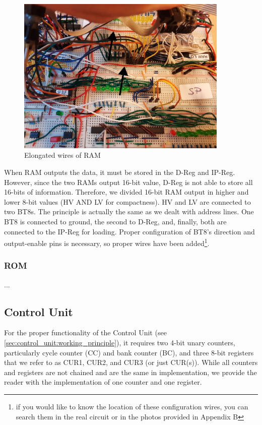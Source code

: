 \begin{figure}[H]
	\centering
	\includegraphics[width=0.9\textwidth]{img/elong_wires_ram}
	\caption{Elongated wires of RAM}
	\label{fig:ram:elongated_wires}
\end{figure}

When RAM outputs the data, it must be stored in the D-Reg and IP-Reg. However, since the two RAMs output 16-bit value, D-Reg is not able to store all 16-bits of information. Therefore, we divided 16-bit RAM output in higher and lower 8-bit values (HV AND LV for compactness). HV and LV are connected to two BT8s. The principle is actually the same as we dealt with address lines. One BT8 is connected to ground, the second to D-Reg, and, finally, both are connected to the IP-Reg for loading. Proper configuration of BT8's direction and output-enable pins is necessary, so proper wires have been added\footnote{if you would like to know the location of these configuration wires, you can search them in the real circuit or in the photos provided in Appendix B}.

\subsubsection{ROM} \label{sec:implementation:memory:rom}
...


\subsection{Control Unit} \label{sec:implementation:control_unit}
For the proper functionality of the Control Unit (see \ref{sec:control_unit:working_principle}), it requires two 4-bit unary counters, particularly cycle counter (CC) and bank counter (BC), and three 8-bit registers that we refer to as CUR1, CUR2, and CUR3 (or just CUR(s)). While all counters and registers are not chained and are the same in implementation, we provide the reader with the implementation of one counter and one register.

